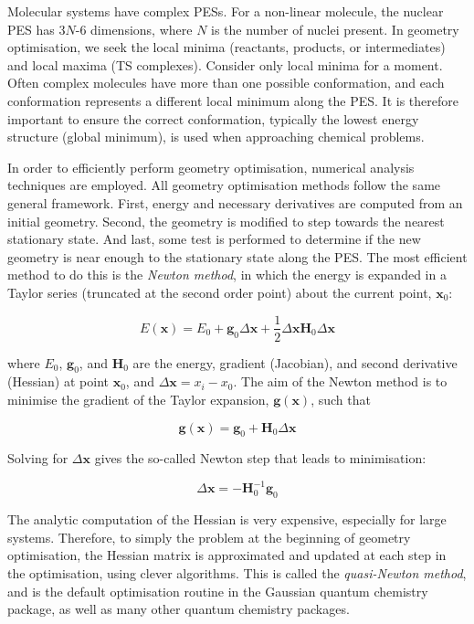 Molecular systems have complex PESs. For a non-linear molecule, the nuclear PES has 3$N$-6 dimensions, where $N$ is the number of nuclei present.\cite{Heidrich1991} In geometry optimisation, we seek the local minima (reactants, products, or intermediates) and local maxima (TS complexes). Consider only local minima for a moment. Often complex molecules have more than one possible conformation, and each conformation represents a different local minimum along the PES. It is therefore important to ensure the correct conformation, typically the lowest energy structure (global minimum), is used when approaching chemical problems.

In order to efficiently perform geometry optimisation, numerical analysis techniques are employed. All geometry optimisation methods follow the same general framework.\cite{Hratchian2005} First, energy and necessary derivatives are computed from an initial geometry. Second, the geometry is modified to step towards the nearest stationary state. And last, some test is performed to determine if the new geometry is near enough to the stationary state along the PES. The most efficient method to do this is the \emph{Newton method}, in which the energy is expanded in a Taylor series (truncated at the second order point) about the current point, $\mathbf{x}_0$:

\begin{equation}
  E(\mathbf{x}) = E_0 + \mathbf{g}_0\Delta\mathbf{x} + \frac{1}{2}\Delta\mathbf{x}\mathbf{H}_0\Delta \mathbf{x}
\end{equation}

\noindent where $E_0$, $\mathbf{g}_0$, and $\mathbf{H}_0$ are the energy, gradient (Jacobian), and second derivative (Hessian) at point $\mathbf{x}_0$, and $\Delta \mathbf{x} = x_i - x_0$. The aim of the Newton method is to minimise the gradient of the Taylor expansion, $\mathbf{g(x)}$, such that

\begin{equation}
  \mathbf{g(x)} = \mathbf{g}_0 + \mathbf{H}_0 \Delta \mathbf{x}
\end{equation}

\noindent Solving for $\Delta \mathbf{x}$ gives the so-called Newton step that leads to minimisation:

\begin{equation}
  \Delta \mathbf{x} = -\mathbf{H}^{-1}_0\mathbf{g}_0
\end{equation}

The analytic computation of the Hessian is very expensive, especially for large systems. Therefore, to simply the problem at the beginning of geometry optimisation, the Hessian matrix is approximated and updated at each step in the optimisation, using clever algorithms.\cite{Hratchian2005} This is called the \emph{quasi-Newton method}, and is the default optimisation routine in the Gaussian\cite{Frisch2009} quantum chemistry package, as well as many other quantum chemistry packages.

